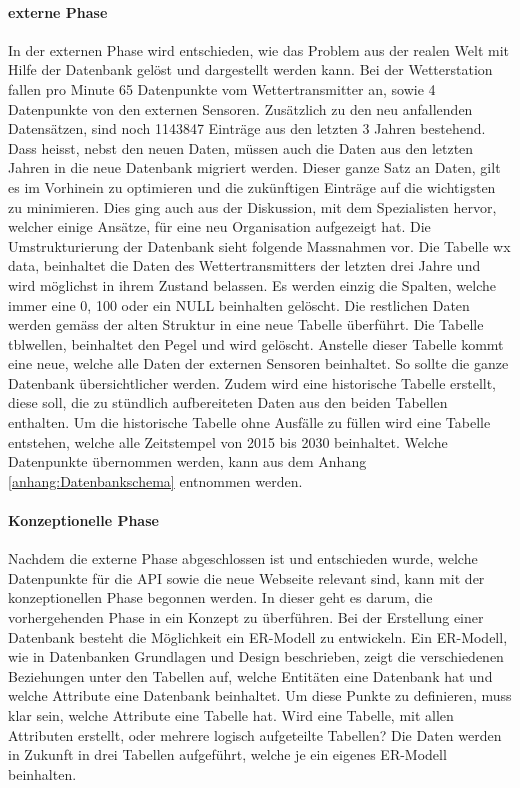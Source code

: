 \paragraph{externe Phase}

In der externen Phase wird entschieden, wie das Problem aus der realen Welt mit Hilfe der Datenbank gelöst und dargestellt werden kann. Bei der Wetterstation fallen pro Minute 65 Datenpunkte vom Wettertransmitter an, sowie 4 Datenpunkte von den externen Sensoren. Zusätzlich zu den neu anfallenden Datensätzen, sind noch 1143847 Einträge aus den letzten 3 Jahren bestehend. Dass heisst, nebst den neuen Daten, müssen auch die Daten aus den letzten Jahren in die neue Datenbank migriert werden. Dieser ganze Satz an Daten, gilt es im Vorhinein zu optimieren und die zukünftigen Einträge auf die wichtigsten zu minimieren. Dies ging auch aus der Diskussion, mit dem Spezialisten hervor, welcher einige Ansätze, für eine neu Organisation aufgezeigt hat. Die Umstrukturierung der Datenbank sieht folgende Massnahmen vor. Die Tabelle wx data, beinhaltet die Daten des Wettertransmitters der letzten drei Jahre und wird möglichst in ihrem Zustand belassen. Es werden einzig die Spalten, welche immer eine 0, 100 oder ein NULL beinhalten gelöscht. Die restlichen Daten werden gemäss der alten Struktur in eine neue Tabelle überführt. Die Tabelle tblwellen, beinhaltet den Pegel und wird gelöscht. Anstelle dieser Tabelle kommt eine neue, welche alle Daten der externen Sensoren beinhaltet. So sollte die ganze Datenbank übersichtlicher werden. Zudem wird eine historische Tabelle erstellt, diese soll, die zu stündlich aufbereiteten Daten aus den beiden Tabellen enthalten. Um die historische Tabelle ohne Ausfälle zu füllen wird eine Tabelle entstehen, welche alle Zeitstempel von 2015 bis 2030 beinhaltet. Welche Datenpunkte übernommen werden, kann aus dem Anhang \ref{anhang:Datenbankschema} entnommen werden.\\

\paragraph{Konzeptionelle Phase}

Nachdem die externe Phase abgeschlossen ist und entschieden wurde, welche Datenpunkte für die API sowie die neue Webseite relevant sind, kann mit der konzeptionellen Phase begonnen werden. In dieser geht es darum, die vorhergehenden Phase in ein Konzept zu überführen. Bei der Erstellung einer Datenbank besteht die Möglichkeit ein ER-Modell zu entwickeln. Ein ER-Modell, wie in Datenbanken Grundlagen und Design \cite{FrankGeisler2011mitpu} beschrieben, zeigt die verschiedenen Beziehungen unter den Tabellen auf, welche Entitäten eine Datenbank hat und welche Attribute eine Datenbank beinhaltet. Um diese Punkte zu definieren, muss klar sein, welche Attribute eine Tabelle hat. Wird eine Tabelle, mit allen Attributen erstellt, oder mehrere logisch aufgeteilte Tabellen? Die Daten werden in Zukunft in drei Tabellen aufgeführt, welche je ein eigenes ER-Modell beinhalten.\\

